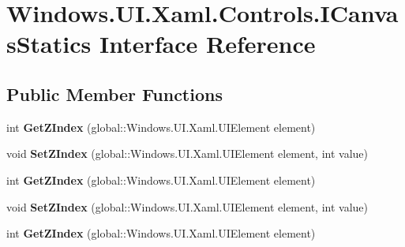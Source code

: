 \hypertarget{interface_windows_1_1_u_i_1_1_xaml_1_1_controls_1_1_i_canvas_statics}{}\section{Windows.\+U\+I.\+Xaml.\+Controls.\+I\+Canvas\+Statics Interface Reference}
\label{interface_windows_1_1_u_i_1_1_xaml_1_1_controls_1_1_i_canvas_statics}
\subsection*{Public Member Functions}
\begin{DoxyCompactItemize}
\item 
\mbox{\label{interface_windows_1_1_u_i_1_1_xaml_1_1_controls_1_1_i_canvas_statics_a324efd7938fc847fe5b7b78932006c57}} 
int {\bfseries Get\+Z\+Index} (global\+::\+Windows.\+U\+I.\+Xaml.\+U\+I\+Element element)
\item 
\mbox{\label{interface_windows_1_1_u_i_1_1_xaml_1_1_controls_1_1_i_canvas_statics_a08d5b549b32b6a15542fa05c96024eaa}} 
void {\bfseries Set\+Z\+Index} (global\+::\+Windows.\+U\+I.\+Xaml.\+U\+I\+Element element, int value)
\item 
\mbox{\label{interface_windows_1_1_u_i_1_1_xaml_1_1_controls_1_1_i_canvas_statics_a324efd7938fc847fe5b7b78932006c57}} 
int {\bfseries Get\+Z\+Index} (global\+::\+Windows.\+U\+I.\+Xaml.\+U\+I\+Element element)
\item 
\mbox{\label{interface_windows_1_1_u_i_1_1_xaml_1_1_controls_1_1_i_canvas_statics_a08d5b549b32b6a15542fa05c96024eaa}} 
void {\bfseries Set\+Z\+Index} (global\+::\+Windows.\+U\+I.\+Xaml.\+U\+I\+Element element, int value)
\item 
\mbox{\label{interface_windows_1_1_u_i_1_1_xaml_1_1_controls_1_1_i_canvas_statics_a324efd7938fc847fe5b7b78932006c57}} 
int {\bfseries Get\+Z\+Index} (global\+::\+Windows.\+U\+I.\+Xaml.\+U\+I\+Element element)

\end{DoxyCompactItemize}
